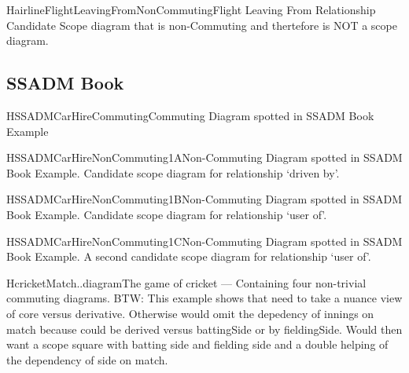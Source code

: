 \begin{erboxedFigure}{H}{airlineFlightLeavingFromNonCommuting}{Flight Leaving From Relationship Candidate Scope diagram that is non-Commuting and thertefore is NOT a scope diagram.}

\end{erboxedFigure}

\subsection{SSADM Book}
\begin{erboxedFigure}{H}{SSADMCarHireCommuting}{Commuting Diagram spotted in SSADM Book Example}

\end{erboxedFigure}

\begin{erboxedFigure}{H}{SSADMCarHireNonCommuting1A}{Non-Commuting Diagram spotted in SSADM Book Example. Candidate scope diagram for relationship `driven by'.}

\end{erboxedFigure}

\begin{erboxedFigure}{H}{SSADMCarHireNonCommuting1B}{Non-Commuting Diagram spotted in SSADM Book Example. Candidate scope diagram for relationship `user of'.}

\end{erboxedFigure}

\begin{erboxedFigure}{H}{SSADMCarHireNonCommuting1C}{Non-Commuting Diagram spotted in SSADM Book Example. A second candidate scope diagram for relationship `user of'.}

\end{erboxedFigure}

\begin{erboxedFigure}{H}{cricketMatch..diagram}{The game of cricket --- Containing four non-trivial commuting diagrams. BTW: This example shows that need to take a nuance view of core versus derivative. Otherwise would omit the depedency of innings on match
because could be derived versus battingSide or by fieldingSide. Would then want a scope square with batting side and fielding side and a double helping of the dependency of side on match.}

\end{erboxedFigure}

